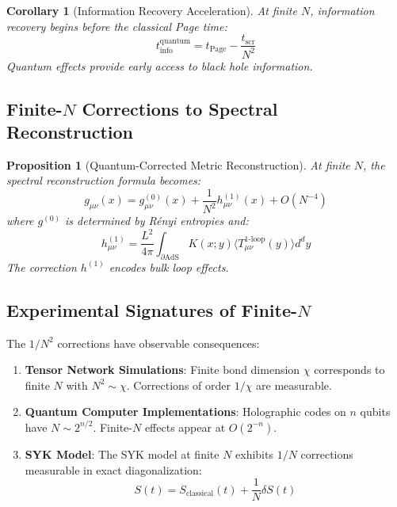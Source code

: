 \documentclass[12pt,a4paper]{article}
\newtheorem{proposition}[theorem]{Proposition}
\newtheorem{corollary}[theorem]{Corollary}
\begin{document}
\begin{corollary}[Information Recovery Acceleration]
At finite $N$, information recovery begins before the classical Page time:
\begin{equation}
t_{\text{info}}^{\text{quantum}} = t_{\text{Page}} - \frac{t_{\text{scr}}}{N^2}
\end{equation}
Quantum effects provide early access to black hole information.
\end{corollary}

\subsection{Finite-$N$ Corrections to Spectral Reconstruction}

\begin{proposition}[Quantum-Corrected Metric Reconstruction]
At finite $N$, the spectral reconstruction formula becomes:
\begin{equation}
g_{\mu\nu}(x) = g_{\mu\nu}^{(0)}(x) + \frac{1}{N^2} h_{\mu\nu}^{(1)}(x) + O(N^{-4})
\end{equation}
where $g^{(0)}$ is determined by R\'enyi entropies and:
\begin{equation}
h_{\mu\nu}^{(1)} = \frac{L^2}{4\pi} \int_{\partial\text{AdS}} K(x; y) \langle T_{\mu\nu}^{\text{1-loop}}(y) \rangle d^d y
\end{equation}
The correction $h^{(1)}$ encodes bulk loop effects.
\end{proposition}

\subsection{Experimental Signatures of Finite-$N$}

The $1/N^2$ corrections have observable consequences:

\begin{enumerate}
    \item \textbf{Tensor Network Simulations}: Finite bond dimension $\chi$ corresponds to finite $N$ with $N^2 \sim \chi$. Corrections of order $1/\chi$ are measurable.
    
    \item \textbf{Quantum Computer Implementations}: Holographic codes on $n$ qubits have $N \sim 2^{n/2}$. Finite-$N$ effects appear at $O(2^{-n})$.
    
    \item \textbf{SYK Model}: The SYK model at finite $N$ exhibits $1/N$ corrections measurable in exact diagonalization:
    \begin{equation}
    S(t) = S_{\text{classical}}(t) + \frac{1}{N}\delta S(t)
    \end{equation}
\end{enumerate}
\end{document}
